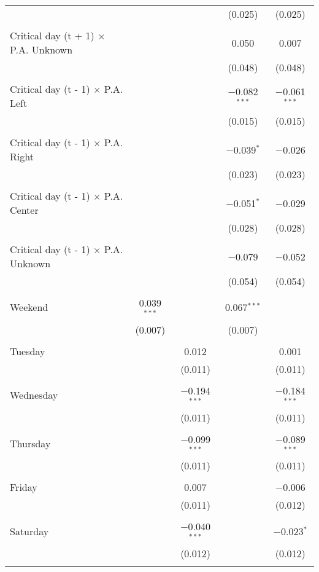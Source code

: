 \documentclass[
]{article}
\begin{document}
\begin{table}[!htbp]
{\begin{tabular}{@{\extracolsep{5pt}}lcccc}
  &  &  & (0.025) & (0.025) \\ 
  & & & & \\ 
 Critical day (t + 1) $\times$ P.A. Unknown &  &  & 0.050 & 0.007 \\ 
  &  &  & (0.048) & (0.048) \\ 
  & & & & \\ 
 Critical day (t - 1) $\times$ P.A. Left &  &  & $-$0.082$^{***}$ & $-$0.061$^{***}$ \\ 
  &  &  & (0.015) & (0.015) \\ 
  & & & & \\ 
 Critical day (t - 1) $\times$ P.A. Right &  &  & $-$0.039$^{*}$ & $-$0.026 \\ 
  &  &  & (0.023) & (0.023) \\ 
  & & & & \\ 
 Critical day (t - 1) $\times$ P.A. Center &  &  & $-$0.051$^{*}$ & $-$0.029 \\ 
  &  &  & (0.028) & (0.028) \\ 
  & & & & \\ 
 Critical day (t - 1) $\times$ P.A. Unknown &  &  & $-$0.079 & $-$0.052 \\ 
  &  &  & (0.054) & (0.054) \\ 
  & & & & \\ 
 Weekend & 0.039$^{***}$ &  & 0.067$^{***}$ &  \\ 
  & (0.007) &  & (0.007) &  \\ 
  & & & & \\ 
 Tuesday &  & 0.012 &  & 0.001 \\ 
  &  & (0.011) &  & (0.011) \\ 
  & & & & \\ 
 Wednesday &  & $-$0.194$^{***}$ &  & $-$0.184$^{***}$ \\ 
  &  & (0.011) &  & (0.011) \\ 
  & & & & \\ 
 Thursday &  & $-$0.099$^{***}$ &  & $-$0.089$^{***}$ \\ 
  &  & (0.011) &  & (0.011) \\ 
  & & & & \\ 
 Friday &  & 0.007 &  & $-$0.006 \\ 
  &  & (0.011) &  & (0.012) \\ 
  & & & & \\ 
 Saturday &  & $-$0.040$^{***}$ &  & $-$0.023$^{*}$ \\ 
  &  & (0.012) &  & (0.012) \\ 
  & & & & \\ 

\end{tabular}}
\end{table}
\end{document}
